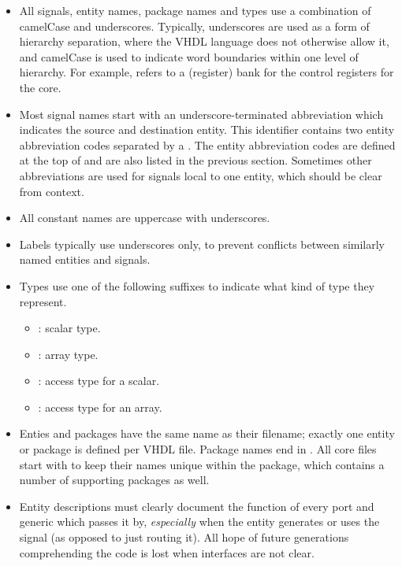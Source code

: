 \begin{itemize}

\item All signals, entity names, package names and types use a combination of 
camelCase and underscores. Typically, underscores are used as a form of 
hierarchy separation, where the VHDL language does not otherwise allow it, and 
camelCase is used to indicate word boundaries within one level of hierarchy. For 
example,  refers to a (register) bank for the control 
registers for the \rvex{} core.

\item Most signal names start with an underscore-terminated abbreviation which 
indicates the source and destination entity. This identifier contains two entity 
abbreviation codes separated by a . The entity abbreviation codes are 
defined at the top of  and are also listed in the previous
section. Sometimes other abbreviations are used for signals local to one entity,
which should be clear from context.

\item All constant names are uppercase with underscores.

\item Labels typically use underscores only, to prevent conflicts between 
similarly named entities and signals.

\item Types use one of the following suffixes to indicate what kind of type they 
represent.
\begin{itemize}
    \item {}: scalar type.
    \item {}: array type.
    \item {}: access type for a scalar.
    \item {}: access type for an array.
\end{itemize}

\item Enties and packages have the same name as their filename; exactly one 
entity or package is defined per VHDL file. Package names end in . 
All \rvex{} core files start with  to keep their names unique within 
the  package, which contains a number of supporting packages as well.

\item Entity descriptions must clearly document the function of every port and
generic which passes it by, \emph{especially} when the entity generates or uses
the signal (as opposed to just routing it). All hope of future generations
comprehending the code is lost when interfaces are not clear.


\end{itemize}
